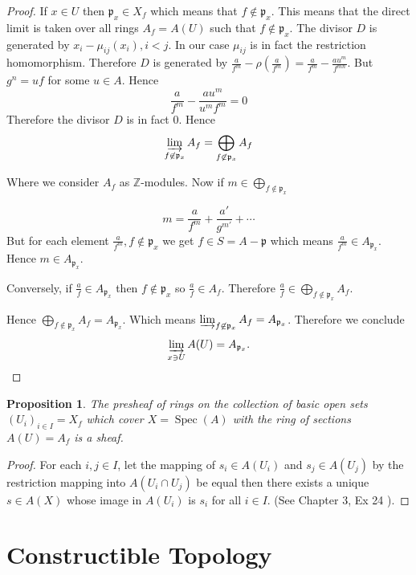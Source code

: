 \documentclass[]{report}
\newtheorem{prop}[theorem]{Proposition}
\DeclareMathOperator\Spec{Spec}
\begin{document}
\begin{proof}
    If $x \in U$ then $\mathfrak{p}_x \in X_f$ which means that $f \not \in \mathfrak{p}_x$. This means that the direct limit is taken over all rings $A_f = A(U)$ such that $f \not \in \mathfrak{p}_x$.
    The divisor $D$ is generated by $x_i - \mu_{ij}(x_i), i < j$. In our case $\mu_{ij}$ is in fact the restriction homomorphism. Therefore $D$ is generated by $\frac{a}{f^m} - \rho(\frac{a}{f^m}) = \frac{a}{f^m} - \frac{au^m}{f^{mn}}$. But $g^n = uf$ for some $u \in A$. Hence
    $$\frac{a}{f^m} - \frac{au^m}{u^m f^m} = 0$$
Therefore the divisor $D$ is in fact $0$. Hence
    $$\varinjlim_{f \not \in \mathfrak{p}_x} A_f = \bigoplus_{f \not \in \mathfrak{p}_x} A_f$$

    Where we consider $A_f$ as $\mathbb{Z}$-modules. 
    Now if $m \in \bigoplus_{f \not \in \mathfrak{p}_x}$

        $$m = \frac{a}{f^m} + \frac{a'}{g^{m'}} + \cdots$$
    But for each element $\frac{a}{f^m}, f \not \in \mathfrak{p}_x$ we get $f \in S = A - \mathfrak{p}$ which means $\frac{a}{f^m} \in A_{\mathfrak{p}_x}$. Hence $m \in A_{\mathfrak{p}_x}$.

    Conversely, if $\frac{a}{f} \in A_{\mathfrak{p}_x}$ then $f \not \in \mathfrak{p}_x$ so $\frac{a}{f} \in A_f$. Therefore $\frac{a}{f} \in \bigoplus_{f \not \in \mathfrak{p}_x} A_f$.

    Hence $\bigoplus_{f \not \in \mathfrak{p}_x} A_f = A_{\mathfrak{p}_x}$. Which means $\varinjlim_{f \not \in \mathfrak{p}_x} A_f = A_{\mathfrak{p}_x}$. Therefore we conclude
    $$\varinjlim_{x \ni U} A(U) = A_{\mathfrak{p}_x}.$$

\end{proof}

\begin{prop}
    The presheaf of rings on the collection of basic open sets $(U_i)_{i \in I} = X_f$ which cover $X = \Spec(A)$ with the ring of sections $A(U) = A_f$ is a \textit{sheaf}. 
\end{prop}

\begin{proof}
    For each $i,j \in I$, let the mapping of $s_i \in A(U_i)$ and $s_j \in A(U_j)$ by the restriction mapping into $A(U_i \cap U_j)$ be equal then there exists a unique $s \in A(X)$ whose image in $A(U_i)$ is $s_i$ for all $i \in I$. (See Chapter 3, Ex 24 \cite{atiyah1}). 
\end{proof}


\section{Constructible Topology}
\end{document}

